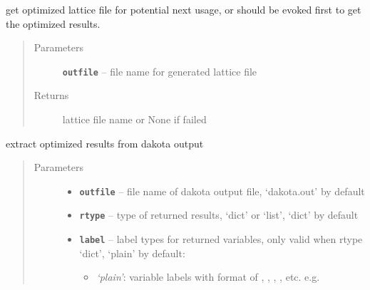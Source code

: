 \documentclass[letterpaper,10pt,english]{sphinxmanual}
\begin{document}
\begin{fulllineitems}
\begin{fulllineitems}
\end{fulllineitems}


\begin{fulllineitems}
\label{src/apidocs/genopt:genopt.DakotaOC.get_opt_latfile}
get optimized lattice file for potential next usage,
 or  should be evoked first to get the 
optimized results.
\begin{quote}\begin{description}
\item[{Parameters}] \leavevmode
\textbf{\texttt{outfile}} -- file name for generated lattice file

\item[{Returns}] \leavevmode
lattice file name or None if failed

\end{description}\end{quote}

\end{fulllineitems}


\begin{fulllineitems}
\label{src/apidocs/genopt:genopt.DakotaOC.get_opt_results}
extract optimized results from dakota output
\begin{quote}\begin{description}
\item[{Parameters}] \leavevmode\begin{itemize}
\item {} 
\textbf{\texttt{outfile}} -- file name of dakota output file, 
`dakota.out' by default

\item {} 
\textbf{\texttt{rtype}} -- type of returned results, `dict' or `list', 
`dict' by default

\item {} 
\textbf{\texttt{label}} -- 
label types for returned variables, only valid when rtype `dict', 
`plain' by default:
\begin{itemize}
\item {} 
\emph{`plain'}: variable labels with format of , , , , etc.
e.g. 


\end{itemize}
\end{itemize}
\end{description}
\end{quote}
\end{fulllineitems}
\end{fulllineitems}
\end{document}
